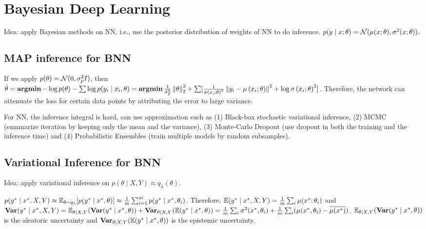 \section{Bayesian Deep Learning}

Idea: apply Bayesian methods on NN, i.e., use the posterior distribution of weights of NN to do inference. $p(y\mid x;\theta) = \mathcal{N}(\mu(x;\theta), \sigma^2(x;\theta))$.

\subsection{MAP inference for BNN}

If we apply $p(\theta)=\mathcal{N}(0,\sigma_p^2 I)$, then $\hat{\theta} = \operatorname{\textbf{argmin}} -\log p(\theta) - \sum \log p(y_i\mid x_i,\theta) = \operatorname{\textbf{argmin}} \frac{1}{\sigma_p^2}\left\lVert\theta\right\rVert_2^2 + \sum [\frac{1}{\sigma\left(x_{i} ; \theta\right)^{2}}\left\|y_{i}-\mu\left(x_{i} ; \theta\right)\right\|^{2}+\log \sigma\left(x_{i} ; \theta\right)^{2}]$. Therefore, the network can attenuate the loss for certain data points by attributing the error to large variance.

For NN, the inference integral is hard, can use approximation such as (1) Black-box stochastic variational inference, (2) MCMC (summarize iteration by keeping only the mean and the variance), (3) Monte-Carlo Dropout (use dropout in both the training and the inference time) and (4) Probabilistic Ensembles (train multiple models by random subsamples).

\subsection{Variational Inference for BNN}

Idea: apply variational inference on $p(\theta\mid X,Y)\approx q_\lambda(\theta)$.

$p(y^*\mid x^*, X,Y)\approx \mathbb{E}_{\theta\sim q_\lambda}[p(y^*\mid x^*,\theta)]\approx \frac{1}{m}\sum_{i=1}^m p(y^*\mid x^*,\theta_i)$. Therefore, $\mathbb{E}(y^*\mid x^*, X,Y) = \frac{1}{m}\sum_i \mu(x^*; \theta_i)$ and $\operatorname{\textbf{Var}}(y^*\mid x^*,X,Y) = \mathbb{E}_{\theta\mid X,Y}(\operatorname{\textbf{Var}}(y^*\mid x^*,\theta))+\operatorname{\textbf{Var}}_{\theta\mid X,Y}(\mathbb{E}(y^*\mid x^*,\theta)) = \frac{1}{m}\sum_i \sigma^2(x^*, \theta_i)+\frac{1}{m}\sum_i(\mu(x^*,\theta_i)-\overline{\mu(x^*)})$. $\mathbb{E}_{\theta\mid X,Y}(\operatorname{\textbf{Var}}(y^*\mid x^*,\theta))$ is the aleatoric uncertainty and $\operatorname{\textbf{Var}}_{\theta\mid X,Y}(\mathbb{E}(y^*\mid x^*,\theta))$ is the epistemic uncertainty.